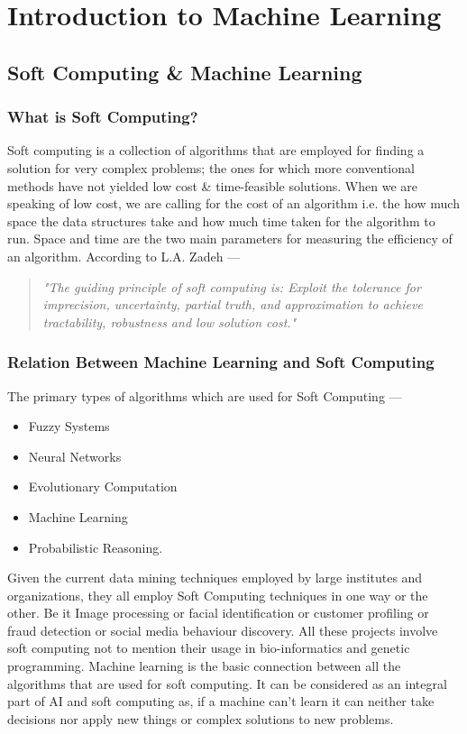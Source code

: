 \chapter{Introduction to Machine Learning}
\section{Soft Computing \& Machine Learning}
\subsection{What is Soft Computing?}
Soft computing is a collection of algorithms that are employed for finding a solution for very complex problems; the ones for which more conventional methods have not yielded low cost \& time-feasible solutions. When we are speaking of low cost, we are calling for the cost of an algorithm i.e. the how much space the data structures take and how much time taken for the algorithm to run. Space and time are the two main parameters for measuring the efficiency of an algorithm. According to L.A. Zadeh ---
\begin{framed}
\begin{quote}
{\large \textit{"The guiding principle of soft computing is: Exploit the tolerance for imprecision, uncertainty, partial truth, and approximation to achieve tractability, robustness and low solution cost."}}
\end{quote}
\end{framed}
\subsection{Relation Between Machine Learning and Soft Computing}
The primary types of algorithms which are used for Soft Computing ---
\begin{itemize}
\item Fuzzy Systems
\item Neural Networks
\item Evolutionary Computation
\item Machine Learning
\item Probabilistic Reasoning.
\end{itemize}
Given the current data mining techniques employed by large institutes and organizations, they all employ Soft Computing techniques in one way or the other. Be it Image processing or facial identification or customer profiling or fraud detection or social media behaviour discovery. All these projects involve soft computing not to mention their usage in bio-informatics and genetic programming.
Machine learning is the basic connection between all the algorithms that are used for soft computing. It can be considered as an integral part of AI and soft computing as, if a machine can't learn it can neither take decisions nor apply new things or complex solutions to new problems.
